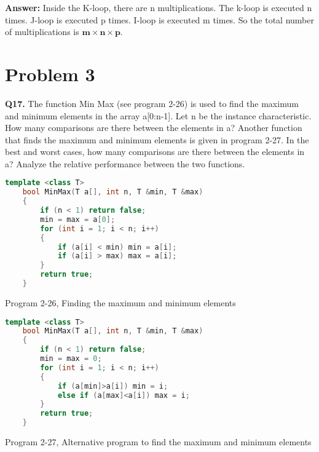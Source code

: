 \documentclass{article}
\begin{document}
\textbf{Answer:} Inside the K-loop, there are n multiplications. The k-loop is executed n times. J-loop is executed p times. I-loop is executed m times. So the total number of multiplications is $\mathbf{m\times n\times p}$.

\section{Problem 3}

\textbf{Q17.}
The function Min Max (see program 2-26) is used to find the maximum and minimum elements in the array a[0:n-1]. Let n be the instance characteristic. How many comparisons are there between the elements in a? Another function that finds the maximum and minimum elements is given in program 2-27. In the best and worst cases, how many comparisons are there between the elements in a? Analyze the relative performance between the two functions.


\begin{lstlisting}[language=C++]
    template <class T>
    bool MinMax(T a[], int n, T &min, T &max)
    {
        if (n < 1) return false;
        min = max = a[0];
        for (int i = 1; i < n; i++)
        {
            if (a[i] < min) min = a[i];
            if (a[i] > max) max = a[i];
        }
        return true;
    }
\end{lstlisting}
\begin{center}
    Program 2-26, Finding the maximum and minimum elements
\end{center}


\begin{lstlisting}[language=C++]
    template <class T>
    bool MinMax(T a[], int n, T &min, T &max)
    {
        if (n < 1) return false;
        min = max = 0;
        for (int i = 1; i < n; i++)
        {
            if (a[min]>a[i]) min = i;
            else if (a[max]<a[i]) max = i;
        }
        return true;
    }
\end{lstlisting}
\begin{center}
    Program 2-27, Alternative program to find the maximum and minimum elements
\end{center}
\end{document}
